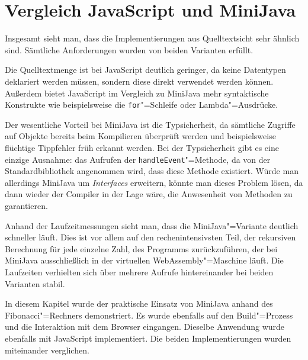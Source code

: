 \section{Vergleich JavaScript und MiniJava}

Insgesamt sieht man, dass die Implementierungen aus Quelltextsicht sehr ähnlich sind. Sämtliche Anforderungen wurden von beiden Varianten erfüllt.

Die Quelltextmenge ist bei JavaScript deutlich geringer, da keine Datentypen deklariert werden müssen, sondern diese direkt verwendet werden können. Außerdem bietet JavaScript im Vergleich zu MiniJava mehr syntaktische Konstrukte wie beispielsweise die \lstinline{for}"=Schleife oder Lambda"=Ausdrücke. 

Der wesentliche Vorteil bei MiniJava ist die Typsicherheit, da sämtliche Zugriffe auf Objekte bereits beim Kompilieren überprüft werden und beispielsweise flüchtige Tippfehler früh erkannt werden. Bei der Typsicherheit gibt es eine einzige Ausnahme: das Aufrufen der \lstinline{handleEvent}"=Methode, da von der Standardbibliothek angenommen wird, dass diese Methode existiert. Würde man allerdings MiniJava um \emph{Interfaces} erweitern, könnte man dieses Problem lösen, da dann wieder der Compiler in der Lage wäre, die Anwesenheit von Methoden zu garantieren.

Anhand der Laufzeitmessungen sieht man, dass die MiniJava"=Variante deutlich schneller läuft. Dies ist vor allem auf den rechenintensivsten Teil, der rekursiven Berechnung für jede einzelne Zahl, des Programms zurückzuführen, der bei MiniJava ausschließlich in der virtuellen WebAssembly"=Maschine läuft. Die Laufzeiten verhielten sich über mehrere Aufrufe hintereinander bei beiden Varianten stabil.

\vspace{4em}
In diesem Kapitel wurde der praktische Einsatz von MiniJava anhand des Fibonacci"=Rechners demonstriert. Es wurde ebenfalls auf den Build"=Prozess und die Interaktion mit dem Browser eingangen. Dieselbe Anwendung wurde ebenfalls mit JavaScript implementiert. Die beiden Implementierungen wurden miteinander verglichen.
